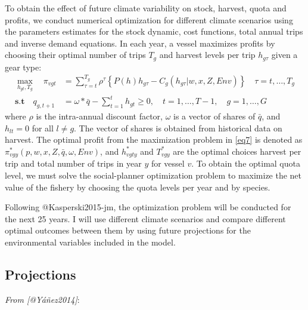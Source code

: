 To obtain the effect of future climate variability on stock, harvest,
quota and profits, we conduct numerical optimization for different
climate scenarios using the parameters estimates for the stock dynamic,
cost functions, total annual trips and inverse demand equations. In each
year, a vessel maximizes profits by choosing their optimal number of
trips \(T_g\) and harvest levels per trip \(h_{g\tau}\) given a gear
type: \begin{align}
\max_{h_{gt}, T_g} \quad \pi_{vgt} & = \sum_{\tau=t}^{T_g} \rho^\tau \left\{ P(h) h_{g\tau} - C_g(h_{g\tau} | w, x, Z, Env) \right\} \quad \tau = t,\ldots, T_g \nonumber \\
\textbf{s.t} \quad q_{g,t+1} & = \omega \ast \bar{q} - \sum_{t=1}^{t} h_{gt} \geq 0, \quad t = 1, \dots, T-1, \quad g = 1, \dots, G
\label{eq7}
\end{align} where \(\rho\) is the intra-annual discount factor,
\(\omega\) is a vector of shares of \(\bar{q}\), and \(h_{lt}=0\) for
all \(l\neq g\). The vector of shares is obtained from historical data
on harvest. The optimal profit from the maximization problem in
\eqref{eq7} is denoted as \(\pi_{vgy}^* (p,w,x,Z,\bar{q},\omega, Env)\),
and \(h_{vgty}^*\) and \(T_{vgy}^*\) are the optimal choices harvest per
trip and total number of trips in year \(y\) for vessel \(v\). To obtain
the optimal quota level, we must solve the social-planner optimization
problem to maximize the net value of the fishery by choosing the quota
levels per year and by species.

Following @Kasperski2015-jm, the optimization problem will be conducted
for the next 25 years. I will use different climate scenarios and
compare different optimal outcomes between them by using future
projections for the environmental variables included in the model.

\hypertarget{projections}{%
\subsection{Projections}\label{projections}}

\emph{From {[}@Yáñez2014{]}}:


